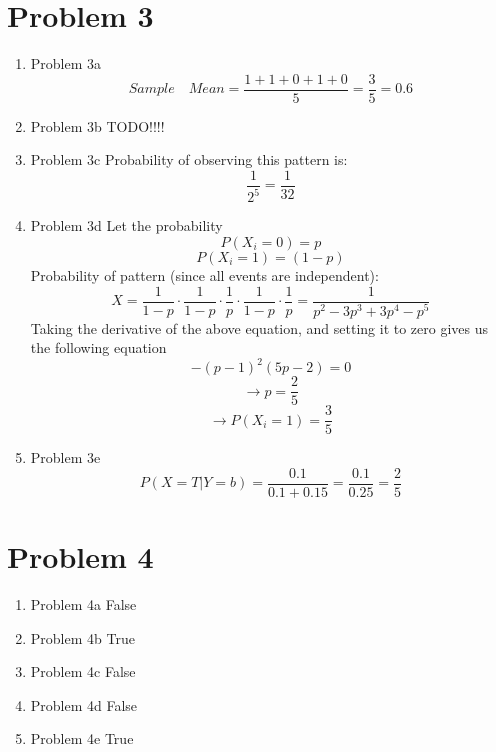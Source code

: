 \documentclass[11pt]{article}
\newcommand{\solution}[1]{{{\color{blue}{\bf Solution:} {#1}}}}
\begin{document}
\newpage

\section{Problem 3}
\begin{enumerate}

\item Problem 3a
\solution{}
$$
Sample\quad Mean = \frac{1 + 1 + 0 + 1 + 0}{5} = \frac{3}{5} = 0.6
$$


\item Problem 3b
\solution{}
TODO!!!!

\item Problem 3c
\solution{}
Probability of observing this pattern is:
$$
\frac{1}{2^5} = \frac{1}{32}
$$

\item Problem 3d
\solution{}
Let the probability 
$$
P(X_{i} = 0) = p
$$
$$
P(X_{i} = 1) = (1 - p)
$$
Probability of pattern (since all events are independent):
$$
X = \frac{1}{1-p} \cdot \frac{1}{1-p} \cdot \frac{1}{p} \cdot \frac{1}{1-p} \cdot \frac{1}{p} = \frac{1}{p^2 - 3p^3 + 3p^4 - p^5}
$$
Taking the derivative of the above equation, and setting it to zero gives us the following equation
$$
- {(p-1)}^2 (5p - 2) = 0
$$
$$
\rightarrow p = \frac{2}{5}
$$
$$
\rightarrow P(X_{i} = 1) = \frac{3}{5}
$$

\item Problem 3e
\solution{}
$$
P(X = T | Y = b) = \frac{0.1}{0.1 + 0.15} = \frac{0.1}{0.25} = \frac{2}{5}
$$
\end{enumerate}

\newpage
\section{Problem 4}
\begin{enumerate}

\item Problem 4a
\solution{}
False

\item Problem 4b
\solution{}
True

\item Problem 4c
\solution{}
False

\item Problem 4d
\solution{}
False

\item Problem 4e
\solution{}
True

\end{enumerate}
\end{document}
